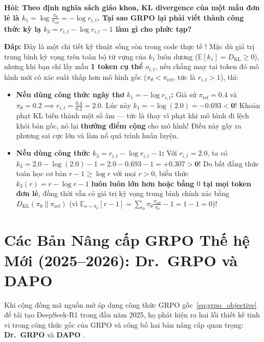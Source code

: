 \begin{debate}
\textbf{Hỏi: Theo định nghĩa sách giáo khoa, KL divergence của một mẫu đơn lẻ là $k_1 = \log \frac{\pi_\theta}{\pi_{\text{ref}}} = -\log r_{i,t}$. Tại sao GRPO lại phải viết thành công thức kỳ lạ $k_3 = r_{i,t} - \log r_{i,t} - 1$ làm gì cho phức tạp?}

\textbf{Đáp:} Đây là một chi tiết kỹ thuật sống còn trong code thực tế \citep{schulman2020approximating}!
Mặc dù giá trị trung bình kỳ vọng trên toàn bộ từ vựng của $k_1$ luôn dương ($\mathbb{E}[k_1] = D_{\text{KL}} \ge 0$), nhưng khi bạn chỉ lấy mẫu \textbf{1 token cụ thể $o_{i,t}$}, nếu chẳng may tại token đó mô hình mới có xác suất thấp hơn mô hình gốc ($\pi_\theta < \pi_{\text{ref}}$, tức là $r_{i,t} > 1$), thì:
\begin{itemize}
  \item \textbf{Nếu dùng công thức ngây thơ $k_1 = -\log r_{i,t}$:} Giả sử $\pi_{\text{ref}} = 0.4$ và $\pi_\theta = 0.2 \implies r_{i,t} = \frac{0.4}{0.2} = 2.0$. Lúc này $k_1 = -\log(2.0) = \mathbf{-0.693 < 0}$! Khoản phạt KL biến thành một số âm --- tức là thay vì phạt khi mô hình đi lệch khỏi bản gốc, nó lại \textbf{thưởng điểm cộng} cho mô hình! Điều này gây ra phương sai cực lớn và làm nổ quá trình huấn luyện.
  \item \textbf{Nếu dùng công thức $k_3 = r_{i,t} - \log r_{i,t} - 1$:} Với $r_{i,t} = 2.0$, ta có $k_3 = 2.0 - \log(2.0) - 1 = 2.0 - 0.693 - 1 = \mathbf{+0.307 > 0}$! Do bất đẳng thức toán học cơ bản $r - 1 \ge \log r$ với mọi $r > 0$, biểu thức $k_3(r) = r - \log r - 1$ \textbf{luôn luôn lớn hơn hoặc bằng $0$ tại mọi token đơn lẻ}, đồng thời vẫn có giá trị kỳ vọng trung bình chính xác bằng $D_{\text{KL}}(\pi_\theta \parallel \pi_{\text{ref}})$ (vì $\mathbb{E}_{o \sim \pi_\theta}[r - 1] = \sum_o \pi_\theta \frac{\pi_{\text{ref}}}{\pi_\theta} - 1 = 1 - 1 = 0$)!
\end{itemize}
\end{debate}

\section{Các Bản Nâng cấp GRPO Thế hệ Mới (2025–2026): Dr.~GRPO và DAPO}
\label{sec:drgrpo_dapo}

Khi cộng đồng mã nguồn mở áp dụng công thức GRPO gốc~\eqref{eq:grpo_objective} để tái tạo DeepSeek-R1 trong đầu năm 2025, họ phát hiện ra hai lỗi thiết kế tinh vi trong công thức gốc của GRPO và công bố hai bản nâng cấp quan trọng: \textbf{Dr.~GRPO} \citep{liu2025understanding} và \textbf{DAPO} \citep{yu2025dapo}.

